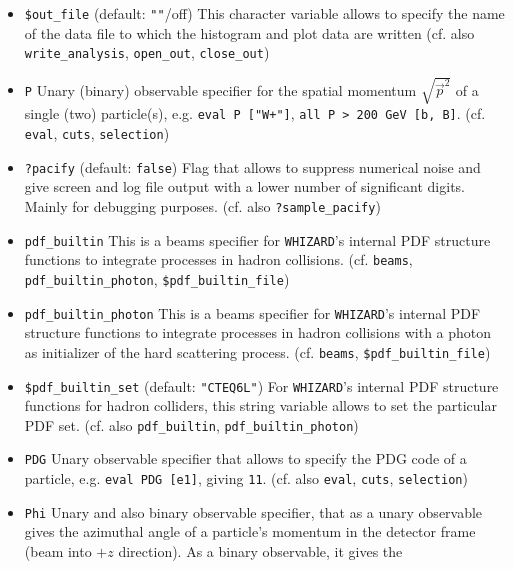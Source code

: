 \documentclass[12pt]{book}
\newcommand{\ttt}[1]{\texttt{#1}}
\newcommand{\whizard}{\texttt{WHIZARD}}
\begin{document}
\begin{itemize}
\item 
\ttt{\$out\_file} \qquad (default: \ttt{""}/off) \newline
This character variable allows to specify the name of the data file to
which the histogram and plot data are written (cf. also 
\ttt{write\_analysis}, \ttt{open\_out}, \ttt{close\_out})
\item
\ttt{P} \newline
Unary (binary) observable specifier for the spatial momentum
$\sqrt{\vec{p}^2}$ of a single (two) particle(s), e.g. \ttt{eval P
["W+"]}, \ttt{all P > 200 GeV [b, B]}. (cf. \ttt{eval}, \ttt{cuts},
\ttt{selection})
\item
\ttt{?pacify} \qquad (default: \ttt{false}) \newline
Flag that allows to suppress numerical noise and give screen and log
file output with a lower number of significant digits. Mainly for
debugging purposes. (cf. also \ttt{?sample\_pacify})
\item
\ttt{pdf\_builtin} \newline
This is a beams specifier for \whizard's internal PDF structure
functions to integrate processes in hadron collisions.
(cf. \ttt{beams}, \ttt{pdf\_builtin\_photon}, 
\ttt{\$pdf\_builtin\_file}) 
\item
\ttt{pdf\_builtin\_photon} \newline
This is a beams specifier for \whizard's internal PDF structure
functions to integrate processes in hadron collisions with a photon as
initializer of the hard scattering process.
(cf. \ttt{beams}, \ttt{\$pdf\_builtin\_file}) 
\item
\ttt{\$pdf\_builtin\_set} \qquad (default: \ttt{"CTEQ6L"}) \newline 
For \whizard's internal PDF structure functions for hadron colliders,
this string variable allows to set the particular PDF set. (cf. also
\ttt{pdf\_builtin}, \ttt{pdf\_builtin\_photon})
\item
\ttt{PDG} \newline
Unary observable specifier that allows to specify the PDG code of a
particle, e.g. \ttt{eval PDG [e1]}, giving \ttt{11}. (cf. also
\ttt{eval}, \ttt{cuts}, \ttt{selection})
\item
\ttt{Phi} \newline
Unary and also binary observable specifier, that as a unary observable
gives the azimuthal angle of a particle's momentum in the detector
frame (beam into $+z$ direction). As a binary observable, it gives the

\end{itemize}
\end{document}
